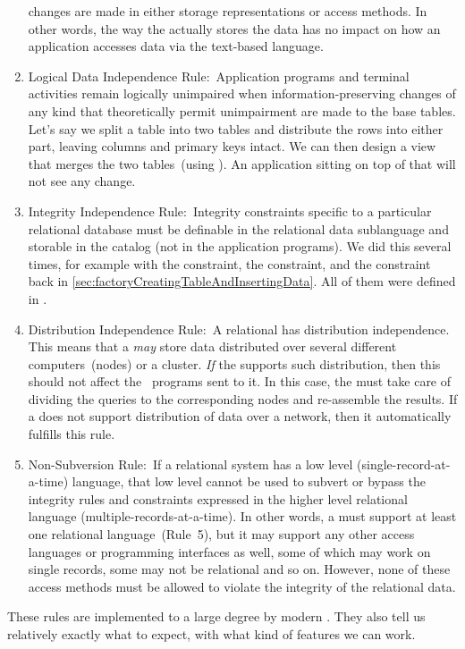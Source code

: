 \begin{enumerate}
changes are made in either storage representations or access methods.
In other words, the way the  actually stores the data has no impact on how an application accesses data via the text-based language.%
%
\item Logical Data Independence Rule:~Application programs and terminal activities remain logically unimpaired when information-preserving changes of any kind that theoretically permit unimpairment are made to the base tables.
Let's say we split a table into two tables and distribute the rows into either part, leaving columns and primary keys intact.
We can then design a view that merges the two tables~(using ).
An application sitting on top of that will not see any change.%
%
\item Integrity Independence Rule:~Integrity constraints specific to a particular relational database must be definable in the relational data sublanguage and storable in the catalog (not in the application programs).
We did this several times, for example with the  constraint, the  constraint, and the  constraint back in \cref{sec:factoryCreatingTableAndInsertingData}.
All of them were defined in \sql.
%
\item Distribution Independence Rule:~A relational  has distribution independence.
This means that a  \emph{may} store data distributed over several different computers~(nodes) or a cluster.
\emph{If} the  supports such distribution, then this should not affect the \sql\ programs sent to it.
In this case, the  must take care of dividing the queries to the corresponding nodes and re-assemble the results.
If a  does not support distribution of data over a network, then it automatically fulfills this rule.%
%
\item Non-Subversion Rule:~If a relational system has a low level (single-record-at-a-time) language, that low level cannot be used to subvert or bypass the integrity rules and constraints expressed in the higher level relational language (multiple-records-at-a-time).
In other words, a  must support at least one relational language~(Rule~5), but it may support any other access languages or programming interfaces as well, some of which may work on single records, some may not be relational and so on.
However, none of these access methods must be allowed to violate the integrity of the relational data.%
%
\end{enumerate}%
%
These rules are implemented to a large degree by modern .
They also tell us relatively exactly what to expect, with what kind of features we can work.%
%
\endhsection%
%
